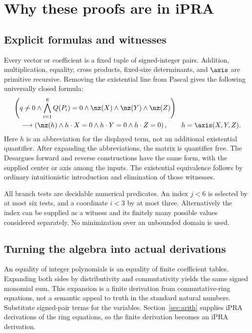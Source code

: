 \section{Why these proofs are in iPRA}\label{sec:internal}

\subsection{Explicit formulas and witnesses}
Every vector or coefficient is a fixed tuple of signed-integer pairs.
Addition, multiplication, equality, cross products, fixed-size
determinants, and $\axis$ are primitive recursive. Removing the
existential line from Pascal gives the following universally closed
formula:
\begin{align*}
 &\left(q\ne0\land\bigwedge_{i=1}^6Q(P_i)=0
             \land\nz(X)\land\nz(Y)\land\nz(Z)\right)\\
 &\quad\longrightarrow
 \left(\nz(h)\land h\cdot X=0\land h\cdot Y=0\land h\cdot Z=0\right),
 \qquad h=\axis(X,Y,Z).
\end{align*}
Here $h$ is an abbreviation for the displayed term, not an additional
existential quantifier. After expanding the abbreviations, the matrix
is quantifier free. The Desargues forward and reverse constructions
have the same form, with the supplied center or axis among the inputs.
The existential equivalence follows by ordinary intuitionistic
introduction and elimination of those witnesses.

All branch tests are decidable numerical predicates. An index $j<6$ is
selected by at most six tests, and a coordinate $i<3$ by at most three.
Alternatively the index can be supplied as a witness and its finitely
many possible values considered separately. No minimization over an
unbounded domain is used.

\subsection{Turning the algebra into actual derivations}
An equality of integer polynomials is an equality of finite coefficient
tables. Expanding both sides by distributivity and commutativity yields
the same signed monomial sum. This expansion is a finite derivation
from commutative-ring equations, not a semantic appeal to truth in the
standard natural numbers. Substitute signed-pair terms for the variables.
Section~\ref{sec:arith} supplies iPRA derivations of the ring equations,
so the finite derivation becomes an iPRA derivation.

